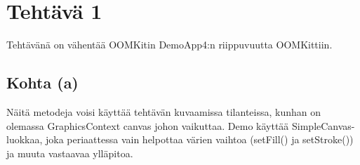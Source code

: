 
\chapter{Tehtävä 1 \label{chap:Teht=0000E4v=0000E4-1}}

Tehtävänä on vähentää OOMKitin DemoApp4:n riippuvuutta OOMKittiin.

\section{Kohta (a)}
\label{Kohta (a)}

Näitä metodeja voisi käyttää tehtävän kuvaamissa tilanteissa, kunhan on olemassa GraphicsContext canvas johon vaikuttaa. Demo käyttää SimpleCanvas-luokkaa, joka periaattessa vain helpottaa värien vaihtoa (setFill() ja setStroke()) ja muuta vastaavaa ylläpitoa.

